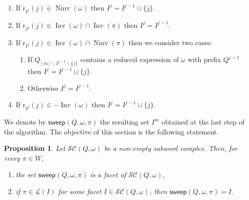 \documentclass[reqno]{amsart}
\newtheorem{proposition}[theorem]{Proposition}
\theoremstyle{definition}
\newcommand{\ssm}{\smallsetminus} %
\DeclareMathOperator{\Inv}{Inv} %
\DeclareMathOperator{\Ninv}{Ninv} %
\newcommand{\linearExtensions}{\mathcal{L}} %
\newcommand{\subwordComplex}{\mathcal{SC}} %
\newcommand{\rootFunction}[2]{\mathrm{r}_{#1}(#2)} %
\newcommand{\sweepingAlgorithm}{\mathsf{sweep}} %
\begin{document}
\begin{enumerate}[{Case} 1:]
    \item If $\rootFunction{I^j}{j}\in \Ninv(\omega)$ then 
    \(
    I^j=I^{j-1}\cup\{j\}.
    \) 
    \label{sweeping_case1}
    \item If $\rootFunction{I^j}{j}\in \Inv(\omega) \cap \Inv(\pi)$ then 
    \(
    I^j=I^{j-1}.
    \)
    \label{sweeping_case2}
    \item If $\rootFunction{I^j}{j}\in \Inv(\omega) \cap \Ninv(\pi)$ then we consider two cases: 
    \label{sweeping_case3} 
    \begin{enumerate}[\hspace{-1cm} (a)]
        \item If $Q_{[m]\ssm I^{j-1}\ssm \{j\}}$ contains a reduced expression of $\omega$ with prefix $Q^{j-1}$ then 
        \(
        {I^j=I^{j-1}\cup \{j\}}.
        \)~
        \label{sweeping_case3a}
        \item Otherwise
        \(
        I^j=I^{j-1}.
        \)
        \label{sweeping_case3b}
    \end{enumerate}
    \item If $\rootFunction{I^j}{j}\in -\Inv(\omega)$ then
    \(
    I^j=I^{j-1}\cup \{j\}.
    \)
    \label{sweeping_case4}
\end{enumerate}

We denote by $\sweepingAlgorithm(Q,\omega,\pi)$ the resulting set $I^m$ obtained at the last step of the algorithm.
The objective of this section is the following statement.

\begin{proposition}
\label{prop:sweeping}
Let $\subwordComplex(Q,\omega)$ be a non-empty subword complex. Then, for every $\pi \in W$, 
\begin{enumerate}
\item the set $\sweepingAlgorithm(Q,\omega,\pi)$ is a facet of $\subwordComplex(Q,\omega)$, \label{item:sweeping1}
\item if $\pi\in \linearExtensions(I)$ for some facet $I\in \subwordComplex(Q,\omega)$, then $\sweepingAlgorithm(Q,\omega,\pi) = I$. \label{item:sweeping2}
\end{enumerate}
\end{proposition}
\end{document}
